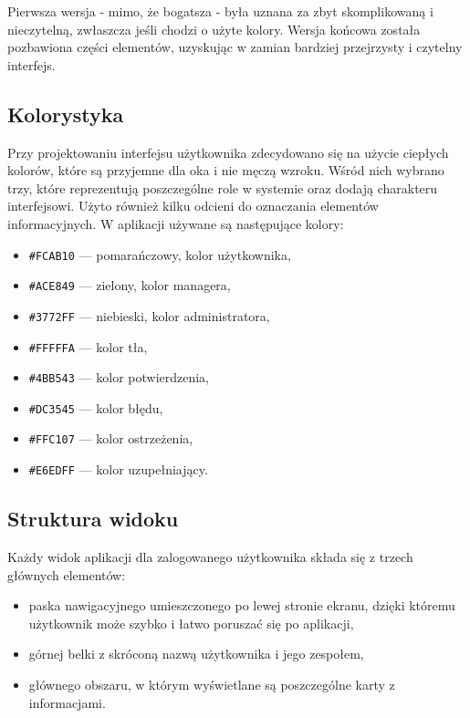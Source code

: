 Pierwsza wersja - mimo, że bogatsza - była uznana za zbyt skomplikowaną i nieczytelną, zwłaszcza jeśli chodzi o użyte kolory. Wersja końcowa została pozbawiona części elementów, uzyskując w zamian bardziej przejrzysty i czytelny interfejs.

\subsection{Kolorystyka}

Przy projektowaniu interfejsu użytkownika zdecydowano się na użycie ciepłych kolorów, które są przyjemne dla oka i nie męczą wzroku. Wśród nich wybrano trzy, które reprezentują poszczególne role w systemie oraz dodają charakteru interfejsowi. Użyto również kilku odcieni do oznaczania elementów informacyjnych. W aplikacji używane są następujące kolory:
\begin{itemize}
    \item \texttt{\#FCAB10} --- pomarańczowy, kolor użytkownika,
    \item \texttt{\#ACE849} --- zielony, kolor managera,
    \item \texttt{\#3772FF} --- niebieski, kolor administratora,
    \item \texttt{\#FFFFFA} --- kolor tła,
    \item \texttt{\#4BB543} --- kolor potwierdzenia,
    \item \texttt{\#DC3545} --- kolor błędu,
    \item \texttt{\#FFC107} --- kolor ostrzeżenia,
    \item \texttt{\#E6EDFF} --- kolor uzupełniający.
\end{itemize}

\subsection{Struktura widoku}

Każdy widok aplikacji dla zalogowanego użytkownika składa się z trzech głównych elementów:
\begin{itemize}
    \item paska nawigacyjnego umieszczonego po lewej stronie ekranu, dzięki któremu użytkownik może szybko i łatwo poruszać się po aplikacji,
    \item górnej belki z skróconą nazwą użytkownika i jego zespołem,
    \item głównego obszaru, w którym wyświetlane są poszczególne karty z informacjami.
\end{itemize}

